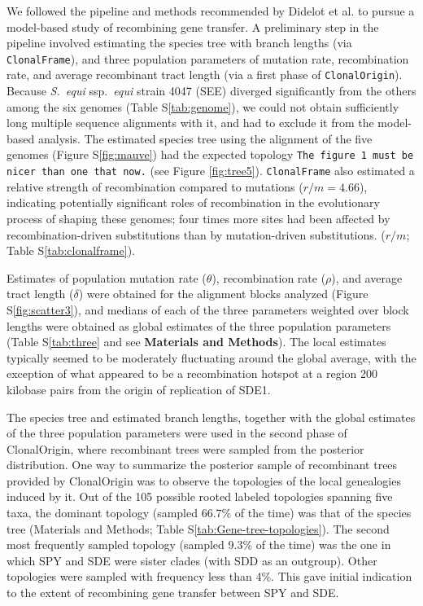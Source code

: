 \documentclass[10pt]{article}
\begin{document}
We followed the pipeline and methods recommended by Didelot et al.
\cite{Didelot2010} to pursue a model-based study of recombining gene transfer. A
preliminary step in the pipeline involved estimating the species
tree with branch lengths (via \texttt{ClonalFrame}), and three population
parameters of mutation rate, recombination rate, and average recombinant tract
length (via a first phase of \texttt{ClonalOrigin}).  Because 
\textit{S.\ equi} ssp.\textit{\ equi} strain 4047 (SEE)
diverged significantly from the others among the six genomes (Table S\ref{tab:genome}), we
could not obtain sufficiently long multiple sequence alignments with
it, and had to exclude it from the model-based analysis.  The estimated species tree
using the alignment of the five genomes (Figure
S\ref{fig:mauve}) had the expected topology \texttt{The figure 1 must be nicer
than one that now.} (see Figure \ref{fig:tree5}). \texttt{ClonalFrame} also
estimated
a relative strength of recombination compared to mutations ($r/m=4.66$), 
indicating potentially significant roles of recombination in the evolutionary
process of shaping these genomes; four times more sites had been affected by
recombination-driven substitutions than by mutation-driven substitutions.
($r/m$; Table S\ref{tab:clonalframe}). 

Estimates of population mutation rate ($\theta$), recombination rate ($\rho$),
and average tract length ($\delta$) were obtained for the alignment blocks
analyzed (Figure S\ref{fig:scatter3}), and 
medians of each of the three parameters weighted over block lengths were
obtained as global estimates of the three population
parameters (Table S\ref{tab:three} and see \textbf{Materials and Methods}).  
The local estimates typically seemed to be
moderately fluctuating around the global average, with the exception of what
appeared to be a recombination hotspot at a region 200 kilobase pairs from the
origin of replication of SDE1.  

The species tree and estimated branch lengths, together with the global
estimates of the three population parameters were used in the second phase of
ClonalOrigin, where recombinant trees were sampled from the posterior
distribution. One way to summarize the posterior sample of recombinant trees
provided by ClonalOrigin was to observe the topologies of the local genealogies
induced by it. Out of the 105 possible rooted labeled topologies spanning five
taxa, the dominant topology (sampled 66.7\% of the time) was that of the species
tree (Materials and Methods; Table S\ref{tab:Gene-tree-topologies}). The second
most frequently sampled topology (sampled 9.3\% of the time) was the one in
which SPY and SDE were sister clades (with SDD as an outgroup). Other topologies
were sampled with frequency less than 4\%. This gave initial indication to the
extent of recombining gene transfer  between SPY and SDE.
\end{document}
